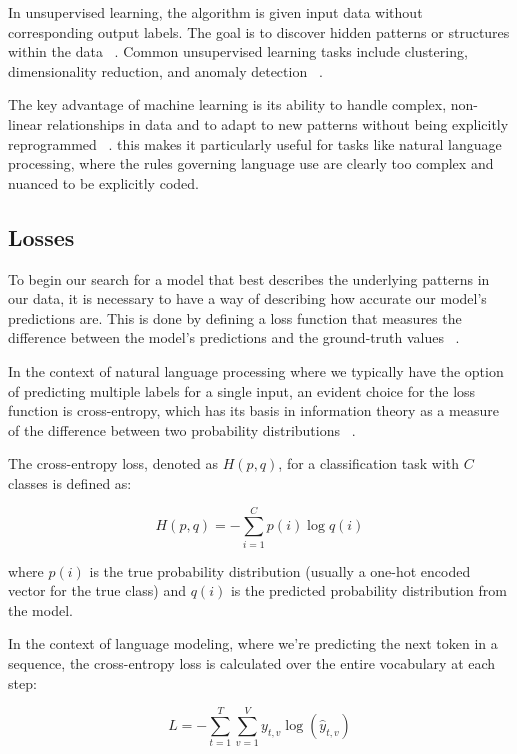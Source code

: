 \documentclass[a4paper, oneside]{discothesis}
\begin{document}
In unsupervised learning, the algorithm is given input data without corresponding output labels. The goal is to discover hidden patterns or structures within the data ~\cite{ghahramani2004unsupervised}. Common unsupervised learning tasks include clustering, dimensionality reduction, and anomaly detection ~\cite{hinton2006reducing}.

The key advantage of machine learning is its ability to handle complex, non-linear relationships in data and to adapt to new patterns without being explicitly reprogrammed ~\cite{goodfellow2016deep}. this makes it particularly useful for tasks like natural language processing, where the rules governing language use are clearly too complex and nuanced to be explicitly coded.

\subsection{Losses}
To begin our search for a model that best describes the underlying patterns in our data, it is necessary to have a way of describing how accurate our model's predictions are. This is done by defining a loss function that measures the difference between the model's predictions and the ground-truth values ~\cite{goodfellow2016deep}.

In the context of natural language processing where we typically have the option of predicting multiple labels for a single input, an evident choice for the loss function is cross-entropy, which has its basis in information theory as a measure of the difference between two probability distributions ~\cite{shannon1948mathematical}.

The cross-entropy loss, denoted as $H(p,q)$, for a classification task with $C$ classes is defined as:

\begin{equation}
    H(p,q) = -\sum_{i=1}^C p(i) \log q(i)
\end{equation}

where $p(i)$ is the true probability distribution (usually a one-hot encoded vector for the true class) and $q(i)$ is the predicted probability distribution from the model.

In the context of language modeling, where we're predicting the next token in a sequence, the cross-entropy loss is calculated over the entire vocabulary at each step:

\begin{equation}
    L = -\sum_{t=1}^T \sum_{v=1}^V y_{t,v} \log(\hat{y}_{t,v})
\end{equation}
\end{document}

